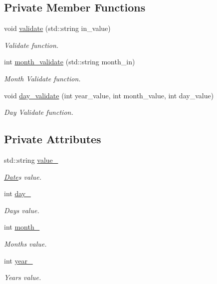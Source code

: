 \subsection*{Private Member Functions}
\begin{DoxyCompactItemize}
\item 
void \hyperlink{classDate_afc019031efa12fdb37066bc7fe287f66}{validate} (std\+::string in\+\_\+value)
\begin{DoxyCompactList}\small\item\em Validate function. \end{DoxyCompactList}\item 
int \hyperlink{classDate_aed23b3625c27fca1007795647778af32}{month\+\_\+validate} (std\+::string month\+\_\+in)
\begin{DoxyCompactList}\small\item\em Month Validate function. \end{DoxyCompactList}\item 
void \hyperlink{classDate_a86974a4c0cb5e7cd73ad1a5310a05638}{day\+\_\+validate} (int year\+\_\+value, int month\+\_\+value, int day\+\_\+value)
\begin{DoxyCompactList}\small\item\em Day Validate function. \end{DoxyCompactList}\end{DoxyCompactItemize}
\subsection*{Private Attributes}
\begin{DoxyCompactItemize}
\item 
std\+::string \hyperlink{classDate_ae79a9217c5779085c923cb82b9a0b339}{value\+\_\+}
\begin{DoxyCompactList}\small\item\em \hyperlink{classDate}{Date}\textquotesingle{}s value. \end{DoxyCompactList}\item 
int \hyperlink{classDate_a041a2fed5be6c658737622fa367af5e4}{day\+\_\+}
\begin{DoxyCompactList}\small\item\em Day\textquotesingle{}s value. \end{DoxyCompactList}\item 
int \hyperlink{classDate_ae70a5a5a937ab5ce563cac90e3d8fd4d}{month\+\_\+}
\begin{DoxyCompactList}\small\item\em Month\textquotesingle{}s value. \end{DoxyCompactList}\item 
int \hyperlink{classDate_a000b73bb5ec170bcb9c55fe504ee1c3c}{year\+\_\+}
\begin{DoxyCompactList}\small\item\em Year\textquotesingle{}s value. \end{DoxyCompactList}\end{DoxyCompactItemize}
